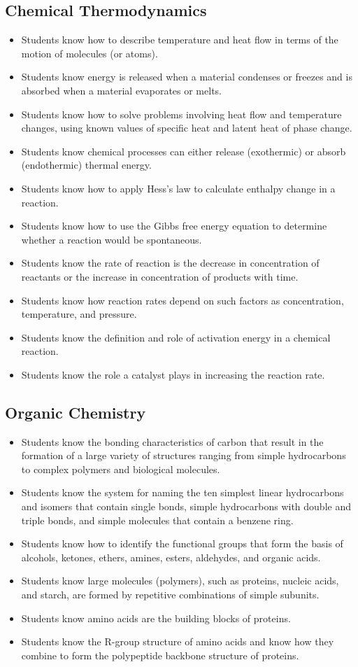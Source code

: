\documentclass[11pt]{article}
\begin{document}
\subsection{Chemical Thermodynamics}
\label{sec:org8ccbccf}
\begin{itemize}
\item Students know how to describe temperature and heat flow in terms of the motion of molecules (or atoms).
\item Students know energy is released when a material condenses or freezes and is absorbed when a material evaporates or melts.
\item Students know how to solve problems involving heat flow and temperature changes, using known values of specific heat and latent heat of phase change.
\item Students know chemical processes can either release (exothermic) or absorb (endothermic) thermal energy.
\item Students know how to apply Hess's law to calculate enthalpy change in a reaction.
\item Students know how to use the Gibbs free energy equation to determine whether a reaction would be spontaneous.
\item Students know the rate of reaction is the decrease in concentration of reactants or the increase in concentration of products with time.
\item Students know how reaction rates depend on such factors as concentration, temperature, and pressure.
\item Students know the definition and role of activation energy in a chemical reaction.
\item Students know the role a catalyst plays in increasing the reaction rate.
\end{itemize}
\subsection{Organic Chemistry}
\label{sec:org4b04e4f}
\begin{itemize}
\item Students know the bonding characteristics of carbon that result in the formation of a large variety of structures ranging from simple hydrocarbons to complex polymers and biological molecules.
\item Students know the system for naming the ten simplest linear hydrocarbons and isomers that contain single bonds, simple hydrocarbons with double and triple bonds, and simple molecules that contain a benzene ring.
\item Students know how to identify the functional groups that form the basis of alcohols, ketones, ethers, amines, esters, aldehydes, and organic acids.
\item Students know large molecules (polymers), such as proteins, nucleic acids, and starch, are formed by repetitive combinations of simple subunits.
\item Students know amino acids are the building blocks of proteins.
\item Students know the R-group structure of amino acids and know how they combine to form the polypeptide backbone structure of proteins.
\end{itemize}
\end{document}
